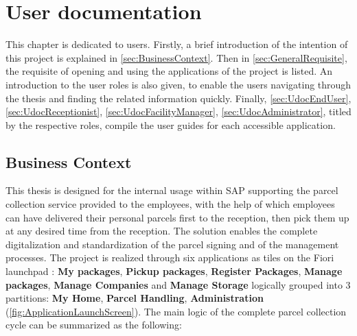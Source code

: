 \chapter{User documentation}
\label{ch:user}

This chapter is dedicated to users. Firstly, a brief introduction of the intention of this project is explained in \autoref{sec:BusinessContext}. Then in \autoref{sec:GeneralRequisite}, the requisite of opening and using the applications of the project is listed. An introduction to the user roles is also given, to enable the users navigating through the thesis and finding the related information quickly.
Finally, \autoref{sec:UdocEndUser}, \autoref{sec:UdocReceptionist}, \autoref{sec:UdocFacilityManager}, \autoref{sec:UdocAdministrator}, titled by the respective roles, compile the user guides for each accessible application.

\section{Business Context}
\label{sec:BusinessContext}

This thesis is designed for the internal usage within SAP supporting the parcel collection service provided to the employees, with the help of which employees can have delivered their personal parcels first to the reception, then pick them up at any desired time from the reception. The solution enables the complete digitalization and standardization of the parcel signing and of the management processes. The project is realized through six applications as tiles on the Fiori launchpad \cite{flp}: \textbf{My packages}, \textbf{Pickup packages}, \textbf{Register Packages}, \textbf{Manage packages}, \textbf{Manage Companies} and \textbf{Manage Storage} logically grouped into 3 partitions: \textbf{My Home}, \textbf{Parcel Handling}, \textbf{Administration} (\autoref{fig:ApplicationLaunchScreen}).
The main logic of the complete parcel collection cycle can be summarized as the following:

